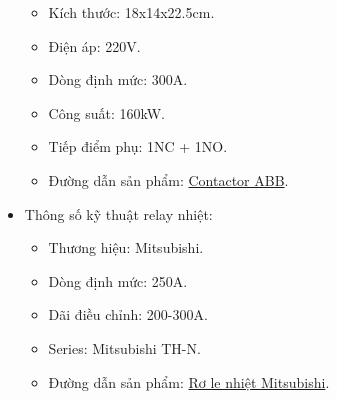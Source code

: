 \begin{itemize}
\begin{itemize}
                            \item Kích thước: 18x14x22.5cm.
                            \item Điện áp: 220V.
                            \item Dòng định mức: 300A.
                            \item Công suất: 160kW.
                            \item Tiếp điểm phụ: 1NC + 1NO.
                            \item Đường dẫn sản phẩm: \href{https://codienhaiau.com/product/1sfl587074r8811/}{Contactor ABB}.
                        \end{itemize}
                    \item Thông số kỹ thuật relay nhiệt:
                        \begin{itemize}
                            \item Thương hiệu: Mitsubishi.
                            \item Dòng định mức: 250A.
                            \item Dãi điều chỉnh: 200-300A.
                            \item Series: Mitsubishi TH-N.
                            \item Đường dẫn sản phẩm: \href{https://codienhaiau.com/product/ro-le-nhiet-mitsubishi-th-n600kp-250a/}{Rơ le nhiệt Mitsubishi}.
                        \end{itemize}
                \end{itemize}
